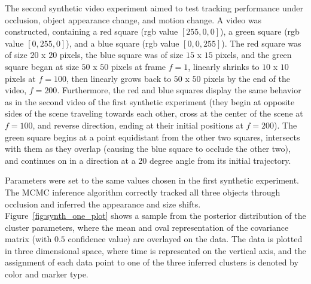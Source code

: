 \documentclass{article}
\begin{document}
The second synthetic video experiment aimed to test tracking performance under occlusion, object appearance change, and motion change. A video was constructed, containing a red square (rgb value $[255,0,0]$), a green square (rgb value $[0,255,0]$), and a blue square (rgb value $[0,0,255]$). The red square was of size $20$ x $20$ pixels, the blue square was of size $15$ x $15$ pixels, and the green square began at size $50$ x $50$ pixels at frame $f=1$, linearly shrinks to $10$ x $10$ pixels at $f=100$, then linearly grows back to $50$ x $50$ pixels by the end of the video, $f=200$. Furthermore, the red and blue squares display the same behavior as in the second video of the first synthetic experiment (they begin at opposite sides of the scene traveling towards each other, cross at the center of the scene at $f=100$, and reverse direction, ending at their initial positions at $f=200$). The green square begins at a point equidistant from the other two squares, intersects with them as they overlap (causing the blue square to occlude the other two), and continues on in a direction at a 20 degree angle from its initial trajectory.

Parameters were set to the same values chosen in the first synthetic experiment. The MCMC inference algorithm correctly tracked all three objects through occlusion and inferred the appearance and size shifts. Figure~\ref{fig:synth_one_plot} shows a sample from the posterior distribution of the cluster parameters, where the mean and oval representation of the covariance matrix (with $0.5$ confidence value) are overlayed on the data. The data is plotted in three dimensional space, where time is represented on the vertical axis, and the assignment of each data point to one of the three inferred clusters is denoted by color and marker type. 
\end{document}
